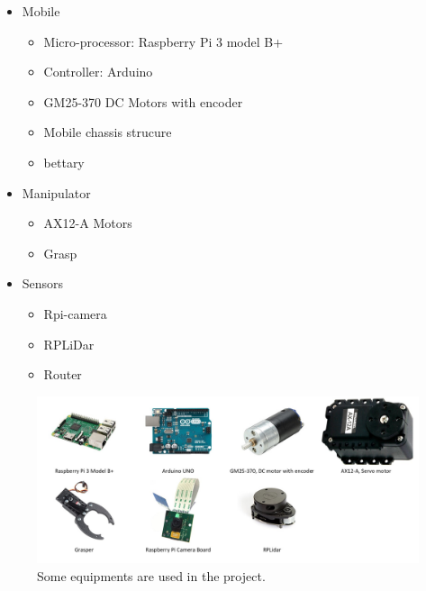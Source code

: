 \documentclass[a4paper, 10pt, conference]{ieeeconf}      %
\begin{document}
\begin{itemize}
\item Mobile

\begin{itemize}
	\item Micro-processor: Raspberry Pi 3 model B+
	\item Controller: Arduino
	\item GM25-370 DC Motors with encoder
	\item Mobile chassis strucure
	\item bettary
\end{itemize}

\item Manipulator
\begin{itemize}
	\item AX12-A Motors
	\item Grasp
\end{itemize}

\item Sensors
\begin{itemize}
	\item Rpi-camera
	\item RPLiDar
	\item Router
\end{itemize}

\end{itemize}

\begin{figure}[h]
\includegraphics[width=0.95\columnwidth]{equipment}
\centering
\caption{Some equipments are used in the project.}
\end{figure}

\end{document}
